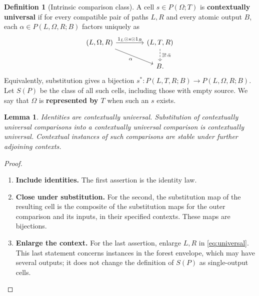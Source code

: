 \documentclass[11pt,reqno]{amsart}
\theoremstyle{plain}
\newtheorem{lemma}[theorem]{Lemma}
\theoremstyle{definition}
\newtheorem{definition}[theorem]{Definition}
\theoremstyle{remark}
\numberwithin{equation}{section}
\newcommand{\wh}{\mathbin{\odot}}
\begin{document}
\begin{definition}[Intrinsic comparison class]\label{def:universal}
A cell $s\in P(\Omega;T)$ is \textbf{contextually universal} if for
every compatible pair of paths $L,R$ and every atomic output $B$, each
$\alpha\in P(L,\Omega,R;B)$ factors uniquely as
\begin{equation}\label{eq:universal}
\begin{tikzcd}[column sep=4em]
(L,\Omega,R) \arrow[r,"1_L\wh s\wh1_R"] \arrow[dr,"\alpha"'] &
(L,T,R) \arrow[d,dashed,"\exists!\,\bar\alpha"]\\
& B.
\end{tikzcd}
\end{equation}
Equivalently, substitution gives a bijection
$s^*:P(L,T,R;B)\to P(L,\Omega,R;B)$.
Let $S(P)$ be the class of all such cells, including those with empty
source. We say that $\Omega$ is \textbf{represented by $T$} when such an
$s$ exists.
\end{definition}

\begin{lemma}\label{lem:universalclosure}
Identities are contextually universal. Substitution of contextually
universal comparisons into a contextually universal comparison is
contextually universal. Contextual instances of such comparisons are
stable under further adjoining contexts.
\end{lemma}
\begin{proof}\leavevmode
\begin{enumerate}
\item \textbf{Include identities.} The first assertion is the identity law.

\item \textbf{Close under substitution.} For the second, the substitution
map of the resulting cell is the composite of the substitution maps for
the outer comparison and its inputs, in their specified contexts. These
maps are bijections.

\item \textbf{Enlarge the context.} For the last assertion, enlarge $L,R$ in
\cref{eq:universal}. This last statement concerns instances in the forest
envelope, which may have several outputs; it does not change the definition
of $S(P)$ as single-output cells.\qedhere
\end{enumerate}
\end{proof}
\end{document}

